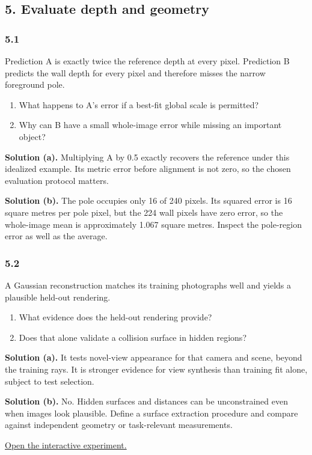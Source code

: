 \documentclass[11pt,a4paper]{article}
\begin{document}
\subsection*{5. Evaluate depth and geometry}
\par
\noindent
\begin{minipage}{\linewidth}
\subsubsection*{5.1}
Prediction A is exactly twice the reference depth at every pixel.
Prediction B predicts the wall depth for every pixel and therefore misses the narrow foreground pole.
\begin{enumerate}[label=(\alph*),nosep]
\item What happens to A's error if a best-fit global scale is permitted?
\item Why can B have a small whole-image error while missing an important object?
\end{enumerate}
\noindent\textbf{Solution (a).} Multiplying A by 0.5 exactly recovers the reference under this idealized example.
Its metric error before alignment is not zero, so the chosen evaluation protocol matters.

\noindent\textbf{Solution (b).} The pole occupies only 16 of 240 pixels.
Its squared error is 16 square metres per pole pixel, but the 224 wall pixels have zero error, so the whole-image mean is approximately 1.067 square metres.
Inspect the pole-region error as well as the average.
\end{minipage}
\par\medskip
\par
\noindent
\begin{minipage}{\linewidth}
\subsubsection*{5.2}
A Gaussian reconstruction matches its training photographs well and yields a plausible held-out rendering.
\begin{enumerate}[label=(\alph*),nosep]
\item What evidence does the held-out rendering provide?
\item Does that alone validate a collision surface in hidden regions?
\end{enumerate}
\noindent\textbf{Solution (a).} It tests novel-view appearance for that camera and scene, beyond the training rays.
It is stronger evidence for view synthesis than training fit alone, subject to test selection.

\noindent\textbf{Solution (b).} No.
Hidden surfaces and distances can be unconstrained even when images look plausible.
Define a surface extraction procedure and compare against independent geometry or task-relevant measurements.
\end{minipage}
\par\medskip
\noindent\href{https://sosekie.github.io/Unibe-CVG-CV-Interactive-Labs/tutorial-10/#evaluation}{Open the interactive experiment.}
\end{document}
